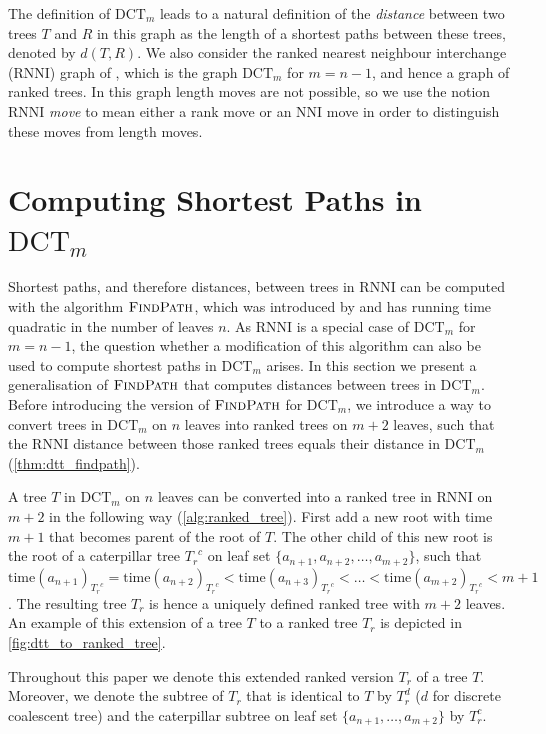 \documentclass[11pt]{amsart}
\newcommand{\rnni}{\mathrm{RNNI}}
\newcommand{\findpath}{\textsc{FindPath}}
\newcommand{\ntime}{\mathrm{time}}
\newcommand{\nni}{\mathrm{NNI}}
\newcommand{\dtt}{\mathrm{DCT}}
\newcommand{\summary}[1]{} %
\begin{document}
The definition of $\dtt_m$ leads to a natural definition of the \emph{distance} between two trees $T$ and $R$ in this graph as the length of a shortest paths between these trees, denoted by $d(T,R)$.
We also consider the ranked nearest neighbour interchange ($\rnni$) graph of \textcite{Collienne2020-iu}, which is the graph $\dtt_m$ for $m=n-1$, and hence a graph of ranked trees.
In this graph length moves are not possible, so we use the notion $\rnni$ \emph{move} to mean either a rank move or an $\nni$ move in order to distinguish these moves from length moves.


\section{Computing Shortest Paths in $\dtt_m$}
\label{section:fp_dtt}

\summary{Introduce how we can use $\findpath$ to compute $\dtt_m$ distances}
Shortest paths, and therefore distances, between trees in $\rnni$ can be computed with the algorithm $\findpath$, which was introduced by \textcite{Collienne2020-iu} and has running time quadratic in the number of leaves $n$.
As $\rnni$ is a special case of $\dtt_m$ for $m = n-1$, the question whether a modification of this algorithm can also be used to compute shortest paths in $\dtt_m$ arises.
In this section we present a generalisation of $\findpath$ that computes distances between trees in $\dtt_m$.
Before introducing the version of $\findpath$ for $\dtt_m$, we introduce a way to convert trees in $\dtt_m$ on $n$ leaves into ranked trees on $m+2$ leaves, such that the $\rnni$ distance between those ranked trees equals their distance in $\dtt_m$ (\autoref{thm:dtt_findpath}).

\summary{How to add leaves to a $\dtt_m$ tree to transform it into a ranked tree}
A tree $T$ in $\dtt_m$ on $n$ leaves can be converted into a ranked tree in $\rnni$ on $m+2$ in the following way (\autoref{alg:ranked_tree}).
First add a new root with time $m + 1$ that becomes parent of the root of $T$.
The other child of this new root is the root of a caterpillar tree ${T_r}^c$ on leaf set $\{a_{n+1}, a_{n+2}, \ldots, a_{m+2}\}$, such that $\ntime(a_{n+1})_{{T_r}^c} = \ntime(a_{n+2})_{{T_r}^c} < \ntime(a_{n+3})_{{T_r}^c} < \ldots < \ntime(a_{m+2})_{{T_r}^c} < m+1$.
The resulting tree $T_r$ is hence a uniquely defined ranked tree with $m+2$ leaves.
An example of this extension of a tree $T$ to a ranked tree $T_r$ is depicted in \autoref{fig:dtt_to_ranked_tree}.

Throughout this paper we denote this extended ranked version $T_r$ of a tree $T$.
Moreover, we denote the subtree of $T_r$ that is identical to $T$ by $T_r^d$ ($d$ for discrete coalescent tree) and the caterpillar subtree on leaf set $\{a_{n+1}, \ldots, a_{m+2}\}$ by $T_r^c$.
\end{document}
